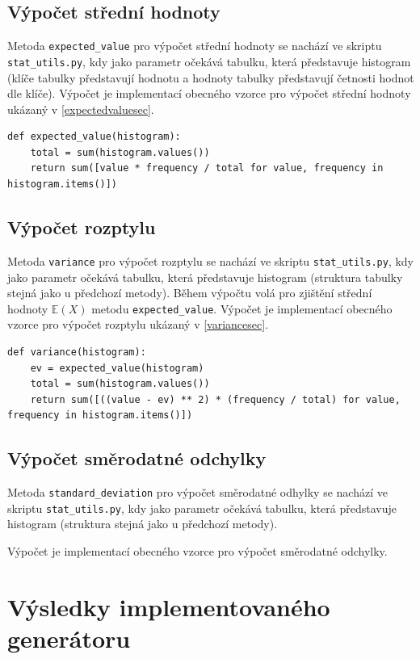 \documentclass[12pt, a4paper]{article}
\let\oldsection\section
\renewcommand\section{\clearpage\oldsection}
\begin{document}
    \subsection{Výpočet střední hodnoty}
    Metoda \texttt{expected\_value} pro výpočet střední hodnoty se nachází ve skriptu \texttt{stat\_utils.py}, kdy jako parametr očekává tabulku,
    která představuje histogram (klíče tabulky představují hodnotu a hodnoty tabulky představují četnosti hodnot dle klíče).
    Výpočet je implementací obecného vzorce pro výpočet střední hodnoty ukázaný v \ref{expectedvaluesec}.

    \begin{lstlisting}
def expected_value(histogram):
    total = sum(histogram.values())
    return sum([value * frequency / total for value, frequency in histogram.items()])
    \end{lstlisting}
    
    \subsection{Výpočet rozptylu}
    Metoda \texttt{variance} pro výpočet rozptylu se nachází ve skriptu \texttt{stat\_utils.py}, kdy jako parametr očekává tabulku,
    která představuje histogram (struktura tabulky stejná jako u předchozí metody).
    Během výpočtu volá pro zjištění střední hodnoty $\mathbb{E}(X)$ metodu \texttt{expected\_value}.
    Výpočet je implementací obecného vzorce pro výpočet rozptylu ukázaný v \ref{variancesec}.

    \begin{lstlisting}
def variance(histogram):
    ev = expected_value(histogram)
    total = sum(histogram.values())
    return sum([((value - ev) ** 2) * (frequency / total) for value, frequency in histogram.items()])
    \end{lstlisting}

    \subsection{Výpočet směrodatné odchylky}
    Metoda \texttt{standard\_deviation} pro výpočet směrodatné odhylky se nachází ve skriptu \texttt{stat\_utils.py}, kdy jako parametr očekává tabulku,
    která představuje histogram (struktura stejná jako u předchozí metody).

    Výpočet je implementací obecného vzorce pro výpočet směrodatné odchylky.
    
    \section{Výsledky implementovaného generátoru}
\end{document}
